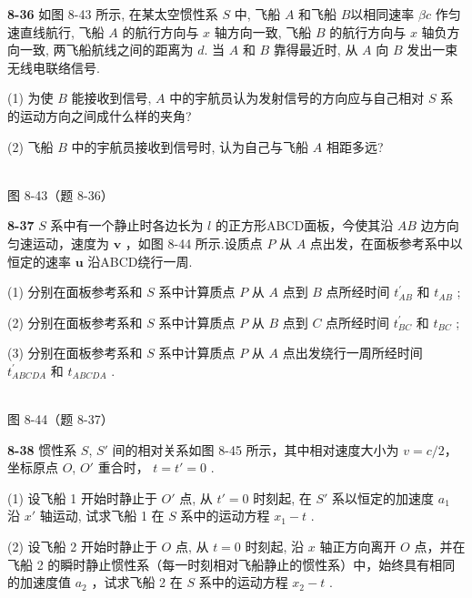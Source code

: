 \newpage

\textbf{8-36} 如图 8-43 所示, 在某太空惯性系 $S$ 中, 飞船 $A$ 和飞船 $B$以相同速率 $\beta c$ 作匀速直线航行, 飞船 $A$ 的航行方向与 $x$ 轴方向一致, 飞船 $B$ 的航行方向与 $x$ 轴负方向一致, 两飞船航线之间的距离为 $d$. 当 $A$ 和 $B$ 靠得最近时, 从 $A$ 向 $B$ 发出一束无线电联络信号.

(1) 为使 $B$ 能接收到信号, $A$ 中的宇航员认为发射信号的方向应与自己相对 $S$ 系的运动方向之间成什么样的夹角?

(2) 飞船 $B$ 中的宇航员接收到信号时, 认为自己与飞船 $A$ 相距多远?

\begin{center}
\resizebox{0.50\textwidth}{!}{}\\[4pt]
{\small 图 8-43（题 8-36）}
\end{center}

\newpage

\textbf{8-37} $S$ 系中有一个静止时各边长为 $l$ 的正方形ABCD面板，今使其沿 $AB$ 边方向匀速运动，速度为 $\pmb{v}$ ，如图 8-44 所示.设质点 $P$ 从 $A$ 点出发，在面板参考系中以恒定的速率 $\pmb{u}$ 沿ABCD绕行一周.

(1) 分别在面板参考系和 $S$ 系中计算质点 $P$ 从 $A$ 点到 $B$ 点所经时间 $t_{AB}^{\prime}$ 和 $t_{AB}$ ;

(2) 分别在面板参考系和 $S$ 系中计算质点 $P$ 从 $B$ 点到 $C$ 点所经时间 $t_{BC}^{\prime}$ 和 $t_{BC}$ ;

(3) 分别在面板参考系和 $S$ 系中计算质点 $P$ 从 $A$ 点出发绕行一周所经时间 $t_{ABCDA}^{\prime}$ 和 $t_{ABCDA}$ .

\begin{center}
\resizebox{0.50\textwidth}{!}{}\\[4pt]
{\small 图 8-44（题 8-37）}
\end{center}

\newpage

\textbf{8-38} 惯性系 $S$, $S'$ 间的相对关系如图 8-45 所示，其中相对速度大小为  $v=c/2$，坐标原点 $O$, $O'$ 重合时， $t=t'=0$ .

(1) 设飞船 1 开始时静止于 $O'$ 点, 从 $t' = 0$ 时刻起, 在 $S'$ 系以恒定的加速度 $a_1$ 沿 $x'$ 轴运动, 试求飞船 1 在 $S$ 系中的运动方程 $x_1 - t$ .

(2) 设飞船 2 开始时静止于 $O$ 点, 从 $t=0$ 时刻起, 沿 $x$ 轴正方向离开 $O$ 点，并在飞船 2 的瞬时静止惯性系（每一时刻相对飞船静止的惯性系）中，始终具有相同的加速度值 $a_{2}$ ，试求飞船 2 在 $S$ 系中的运动方程 $x_{2}-t$ .


